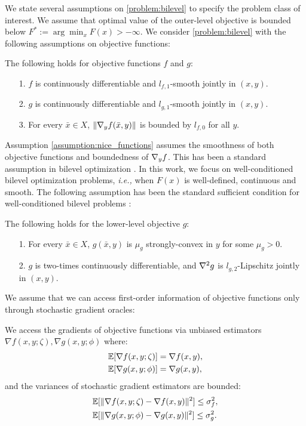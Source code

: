 We state several assumptions on \eqref{problem:bilevel} to specify the problem class of interest. We assume that optimal value of the outer-level objective is bounded below $F^* := \arg \min_x F(x) > -\infty$. We consider \eqref{problem:bilevel} with the following assumptions on objective functions:
\begin{assumption} 
    \label{assumption:nice_functions}
    The following holds for objective functions $f$ and $g$:
    \begin{enumerate}
        \item[1.] $f$ is continuously differentiable and $l_{f,1}$-smooth jointly in $(x,y)$.
        \item[2.]  $g$ is continuously differentiable and $l_{g,1}$-smooth jointly in $(x,y)$.
        \item[3.] For every $\bar{x} \in X$, $\|\nabla_y f(\bar{x}, y)\|$ is bounded by $l_{f,0}$ for all $y$.
    \end{enumerate}
\end{assumption}
Assumption \ref{assumption:nice_functions} assumes the smoothness of both objective functions and boundedness of $\nabla_y f$. This has been a standard assumption in bilevel optimization \cite{ghadimi2018approximation}. In this work, we focus on well-conditioned bilevel optimization problems, {\it i.e.,} when $F(x)$ is well-defined, continuous and smooth. The following assumption has been the standard sufficient condition for well-conditioned bilevel problems \cite{ghadimi2018approximation}:
\begin{assumption}
    \label{assumption:extra_nice_g}
    The following holds for the lower-level objective $g$:
    \begin{enumerate}
        \item[1.] For every $\bar{x} \in X$, $g(\bar{x}, y)$ is $\mu_g$ strongly-convex in $y$ for some $\mu_g > 0$.
        \item[2.] $g$ is two-times continuously differentiable, and $\nabla^2 g$ is $l_{g,2}$-Lipschitz jointly in $(x,y)$.
    \end{enumerate}
\end{assumption}
We assume that we can access first-order information of objective functions only through stochastic gradient oracles:
\begin{assumption}
    \label{assumption:gradient_variance}
    We access the gradients of objective functions via unbiased estimators $\nabla f(x,y;\zeta), \nabla g(x,y;\phi)$ where:
    \begin{align*}
        & \mathbb{E}[\nabla f(x,y;\zeta)] = \nabla f(x, y), \\
        & \mathbb{E}[\nabla g(x,y;\phi)] = \nabla g(x, y),
    \end{align*}
    and the variances of stochastic gradient estimators are bounded:
    \begin{align*}
        & \mathbb{E}[\|\nabla f(x,y; \zeta) - \nabla f(x, y)\|^2] \le \sigma_f^2, \\
        & \mathbb{E}[\|\nabla g(x,y; \phi) - \nabla g(x, y)\|^2] \le \sigma_g^2.
    \end{align*} 
\end{assumption}
